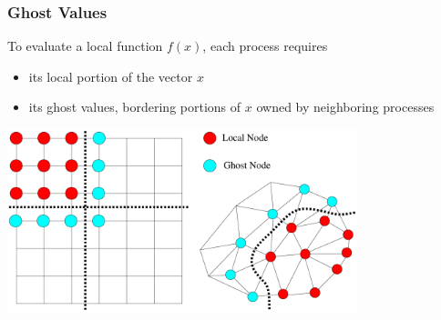 \begin{frame}
\frametitle{Ghost Values}

\begin{block}{To evaluate a local function $f(x)$, each process requires}
\begin{itemize}
  \item its local portion of the vector $x$
  \item its {\color{cyan}ghost values}, bordering portions of $x$ owned by neighboring processes
\end{itemize}
\end{block}

\begin{center}
\includegraphics[width=4in]{figures/DA/GhostValues}
\end{center}

\end{frame}
